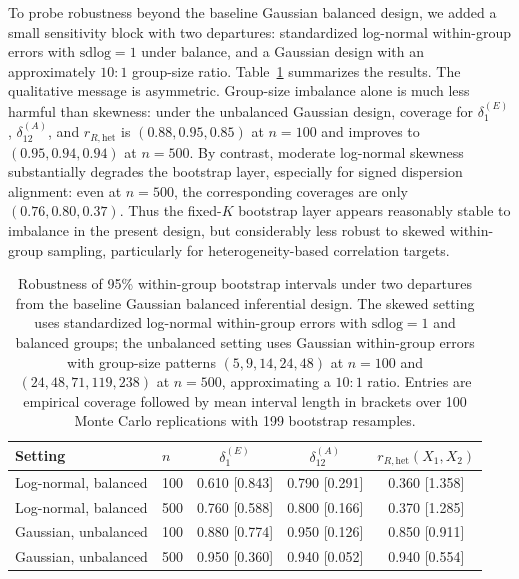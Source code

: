 \documentclass[preprint, times, 12pt, authoryear]{elsarticle}
\begin{document}
To probe robustness beyond the baseline Gaussian balanced design, we added a small sensitivity block with two departures: standardized log-normal within-group errors with $\mathrm{sdlog}=1$ under balance, and a Gaussian design with an approximately $10{:}1$ group-size ratio. Table~\ref{tab:sim_inference_robustness} summarizes the results. The qualitative message is asymmetric. Group-size imbalance alone is much less harmful than skewness: under the unbalanced Gaussian design, coverage for $\delta_1^{(E)}$, $\delta_{12}^{(A)}$, and $r_{R,\mathrm{het}}$ is $(0.88,0.95,0.85)$ at $n=100$ and improves to $(0.95,0.94,0.94)$ at $n=500$. By contrast, moderate log-normal skewness substantially degrades the bootstrap layer, especially for signed dispersion alignment: even at $n=500$, the corresponding coverages are only $(0.76,0.80,0.37)$. Thus the fixed-$K$ bootstrap layer appears reasonably stable to imbalance in the present design, but considerably less robust to skewed within-group sampling, particularly for heterogeneity-based correlation targets.

\begin{table}[ht]
	\centering
	\caption{Robustness of 95\% within-group bootstrap intervals under two departures from the baseline Gaussian balanced inferential design. The skewed setting uses standardized log-normal within-group errors with $\mathrm{sdlog}=1$ and balanced groups; the unbalanced setting uses Gaussian within-group errors with group-size patterns $(5,9,14,24,48)$ at $n=100$ and $(24,48,71,119,238)$ at $n=500$, approximating a $10{:}1$ ratio. Entries are empirical coverage followed by mean interval length in brackets over 100 Monte Carlo replications with 199 bootstrap resamples.}
	\label{tab:sim_inference_robustness}
	\begin{tabular}{llccc}
		\toprule
		Setting & $n$ & $\delta_1^{(E)}$ & $\delta_{12}^{(A)}$ & $r_{R,\mathrm{het}}(X_1,X_2)$ \\
		\midrule
		Log-normal, balanced   & 100 & 0.610 [0.843] & 0.790 [0.291] & 0.360 [1.358] \\
		Log-normal, balanced   & 500 & 0.760 [0.588] & 0.800 [0.166] & 0.370 [1.285] \\
		Gaussian, unbalanced   & 100 & 0.880 [0.774] & 0.950 [0.126] & 0.850 [0.911] \\
		Gaussian, unbalanced   & 500 & 0.950 [0.360] & 0.940 [0.052] & 0.940 [0.554] \\
		\bottomrule
	\end{tabular}
\end{table}
\end{document}
